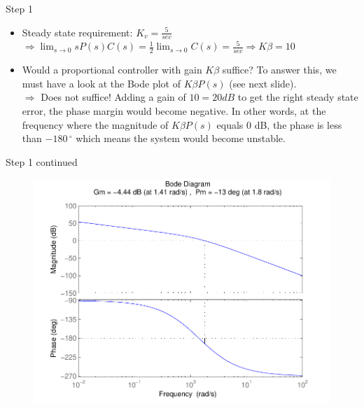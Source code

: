 \begin{frame}
\begin{exampleblock}{Step 1}
	\begin{itemize}
	\item Steady state requirement: $K_v = \frac{5}{sec}$ \\
	$\Rightarrow \lim_{s \to 0} sP(s)C(s) = \frac{1}{2}\lim_{s \to 0} C(s) = \frac{5}{sec} \Rightarrow K\beta = 10$
	\item Would a proportional controller with gain $K\beta$ suffice? To answer this, we must have a look at the Bode plot of $K\beta P(s)$ (see next slide). \\
	$\Rightarrow$ Does not suffice! Adding a gain of $10 = 20 dB$ to get the right steady state error, the phase margin would become negative. In other words, at the frequency where the magnitude of $K\beta P(s)$ equals 0 dB, the phase is less than $-180\,^{\circ}$ which means the system would become unstable.
	\end{itemize}
\end{exampleblock}
\end{frame}

\begin{frame}
\begin{exampleblock}{Step 1 continued}
\begin{figure}
	\centering
	\includegraphics[width=0.6
	\linewidth]{lagstep1better}
\end{figure}	
\end{exampleblock}
\end{frame}

